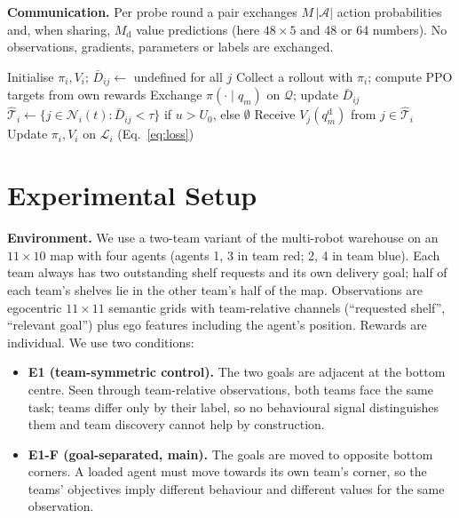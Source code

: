 \documentclass{article}
\newcommand{\ours}{PGCT}
\begin{document}
\textbf{Communication.} Per probe round a pair exchanges $M\,|\mathcal{A}|$ action probabilities and, when sharing,
$M_{\mathrm{d}}$ value predictions (here $48\times5$ and 48 or 64 numbers). No observations, gradients, parameters or labels
are exchanged.

\begin{algorithm}[t]
\caption{\ours{} for agent $i$}
\label{alg:pgct}
\begin{algorithmic}[1]
\State Initialise $\pi_i, V_i$; $\bar D_{ij}\gets$ undefined for all $j$
  \State Collect a rollout with $\pi_i$; compute PPO targets from own rewards
      \State Exchange $\pi(\cdot\mid q_m)$ on $\mathcal{Q}$; update $\bar D_{ij}$
    \EndFor
  \EndIf
  \State $\hat{\mathcal{T}}_i\gets\{j\in\mathcal{N}_i(t): \bar D_{ij}<\tau\}$ if $u>U_0$, else $\emptyset$
  \State Receive $V_j(q^{\mathrm{d}}_m)$ from $j\in\hat{\mathcal{T}}_i$
  \State Update $\pi_i, V_i$ on $\mathcal{L}_i$ (Eq.~\ref{eq:loss})
\EndFor
\end{algorithmic}
\end{algorithm}

\section{Experimental Setup}
\label{sec:setup}
\textbf{Environment.} We use a two-team variant of the multi-robot warehouse \cite{papoudakis2021benchmarking} on an
$11\times10$ map with four agents (agents 1, 3 in team red; 2, 4 in team blue). Each team always has two outstanding
shelf requests and its own delivery goal; half of each team's shelves lie in the other team's half of the map.
Observations are egocentric $11\times11$ semantic grids with team-relative channels (``requested shelf'', ``relevant
goal'') plus ego features including the agent's position. Rewards are individual. We use two conditions:
\begin{itemize}
  \item \textbf{E1 (team-symmetric control).} The two goals are adjacent at the bottom centre. Seen through
    team-relative observations, both teams face the same task; teams differ only by their label, so no behavioural
    signal distinguishes them and team discovery cannot help by construction.
  \item \textbf{E1-F (goal-separated, main).} The goals are moved to opposite bottom corners. A loaded agent must move
    towards its own team's corner, so the teams' objectives imply different behaviour and different values for the
    same observation.
\end{itemize}
\end{document}
